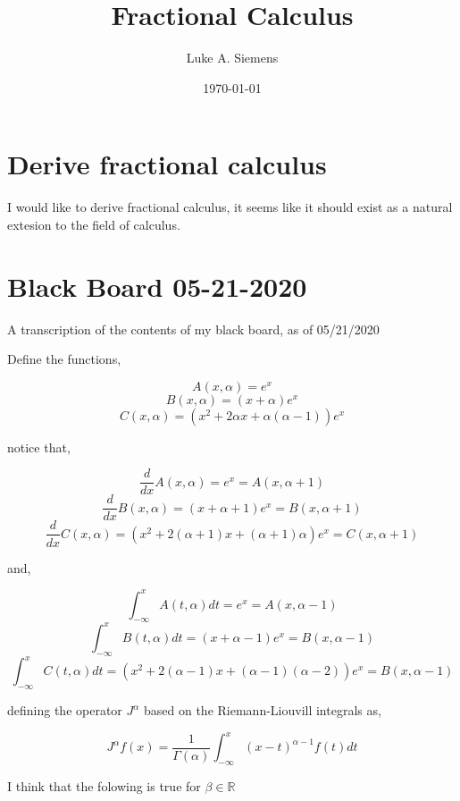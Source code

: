 \documentclass[%
 preprint,
 amsmath, amssymb, aps, pra, 10pt
]{revtex4-2}
\begin{document}
\title{Fractional Calculus}%

\author{Luke A. Siemens}
\noaffiliation

\date{\today}

\maketitle


\section{Derive fractional calculus}
I would like to derive fractional calculus, it seems like it should exist as a natural extesion to the field of calculus.

\section{Black Board 05-21-2020}

A transcription of the contents of my black board, as of 05/21/2020

Define the functions,

\[A(x, \alpha) = e^x\]
\[B(x, \alpha) = \left(x + \alpha \right)e^x\]
\[C(x, \alpha) = \left(x^2 + 2\alpha x + \alpha (\alpha - 1) \right)e^x\]

notice that,

\[\frac{d}{dx} A(x, \alpha) = e^x = A(x, \alpha + 1)\]
\[\frac{d}{dx} B(x, \alpha) = \left(x + \alpha + 1 \right)e^x = B(x, \alpha + 1)\]
\[\frac{d}{dx} C(x, \alpha) = \left(x^2 + 2(\alpha + 1) x + (\alpha + 1)\alpha \right)e^x = C(x, \alpha + 1)\]

and,

\[\int_{-\infty}^xA(t, \alpha)dt = e^x = A(x, \alpha - 1)\]
\[\int_{-\infty}^xB(t, \alpha)dt = \left(x + \alpha - 1 \right)e^x = B(x, \alpha - 1)\]
\[\int_{-\infty}^xC(t, \alpha)dt = \left(x^2 + 2(\alpha - 1) x + (\alpha - 1)(\alpha - 2)\right)e^x = B(x, \alpha - 1)\]

defining the operator $J^\alpha$ based on the Riemann-Liouvill integrals as,

\begin{equation}
J^\alpha f(x) = \frac{1}{\Gamma(\alpha)}\int_{-\infty}^x (x - t)^{\alpha - 1}f(t)dt
\label{operator_fractional_integral}
\end{equation}

I think that the folowing is true for $\beta \in \mathbb{R}$
\end{document}
